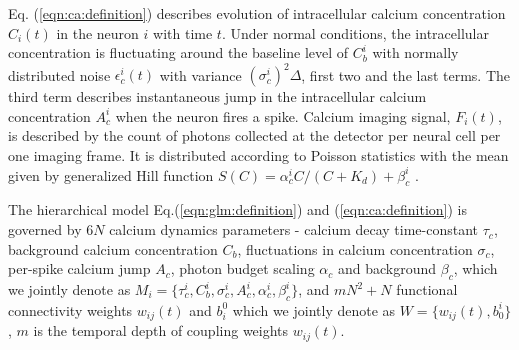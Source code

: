 Eq. (\ref{eqn:ca:definition}) describes evolution of intracellular calcium concentration $C_i(t)$ in the neuron $i$ with time $t$. Under normal conditions, the intracellular concentration is fluctuating around the baseline level of $C^i_b$ with normally distributed noise $\epsilon^i_c(t)$ with variance $(\sigma^i_c)^2\Delta$, first two and the last terms.  The third term describes instantaneous jump in the intracellular calcium concentration $A^i_c$ when the neuron fires a spike.  Calcium imaging signal, $F_i(t)$, is described by the count of photons collected at the detector per neural cell per one imaging frame. It is distributed according to Poisson statistics with the mean given by generalized Hill function $S(C)=\alpha^i_c C/(C+K_d) + \beta^i_c$ \cite{Yasuda2004}.

The hierarchical model Eq.(\ref{eqn:glm:definition}) and (\ref{eqn:ca:definition}) is governed by $6N$ calcium dynamics parameters - calcium decay time-constant $\tau_c$, background calcium concentration $C_{b}$, fluctuations in calcium concentration $\sigma_c$, per-spike calcium jump $A_c$, photon budget scaling $\alpha_c$ and background $\beta_c$, which we jointly denote as $M_i=\{\tau^i_c, C^i_{b}, \sigma^i_c, A^i_c, \alpha^i_c, \beta^i_c\}$, and $m N^2 + N$ functional connectivity weights $w_{ij}(t)$ and $b^0_i$ which we jointly denote as $W=\{w_{ij}(t), b_0^i\}$, $m$ is the temporal depth of coupling weights $w_{ij}(t)$.
